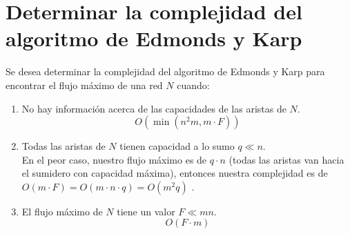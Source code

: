 \documentclass{article}
\begin{document}
\section*{Determinar la complejidad del algoritmo de Edmonds y Karp}

Se desea determinar la complejidad del algoritmo de Edmonds y Karp para encontrar el flujo máximo de una red \( N \) cuando:

\begin{enumerate}
    \item No hay información acerca de las capacidades de las aristas de \( N \).
    \[
    O(\min(n^2 m, m \cdot F))
    \]

    \item Todas las aristas de \( N \) tienen capacidad a lo sumo \( q \ll n \). \\
    
    En el peor caso, nuestro flujo máximo es de \( q \cdot n \) (todas las aristas van hacia el sumidero con capacidad máxima), entonces nuestra complejidad es de \( O(m \cdot F) = O(m \cdot n \cdot q)  = O(m^{2}q) \) .

    \item El flujo máximo de \( N \) tiene un valor \( F \ll mn \).
    \[
    O(F \cdot m)
    \]
\end{enumerate}
\end{document}
